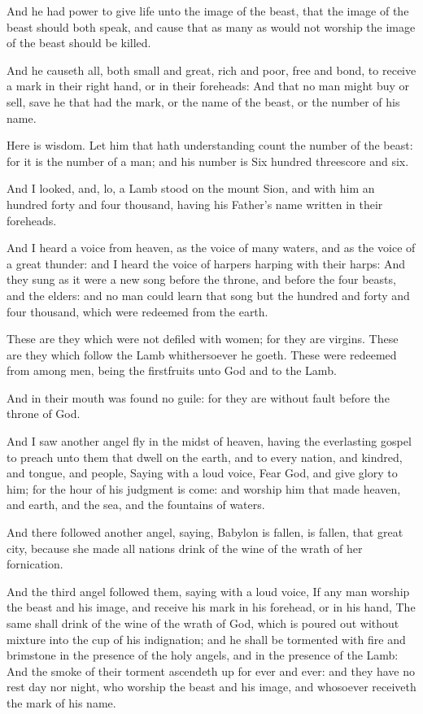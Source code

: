 \Verse And he had power to give life unto the image of the beast, that the image of the beast should both speak, and cause that as many as would not worship the image of the beast should be killed.

\Verse And he causeth all, both small and great, rich and poor, free and bond, to receive a mark in their right hand, or in their foreheads: \Verse And that no man might buy or sell, save he that had the mark, or the name of the beast, or the number of his name.

\Verse Here is wisdom. Let him that hath understanding count the number of the beast: for it is the number of a man; and his number is Six hundred threescore and six.

\Chapter
\Verse And I looked, and, lo, a Lamb stood on the mount Sion, and with him an hundred forty and four thousand, having his Father's name written in their foreheads.

\Verse And I heard a voice from heaven, as the voice of many waters, and as the voice of a great thunder: and I heard the voice of harpers harping with their harps: \Verse And they sung as it were a new song before the throne, and before the four beasts, and the elders: and no man could learn that song but the hundred and forty and four thousand, which were redeemed from the earth.

\Verse These are they which were not defiled with women; for they are virgins. These are they which follow the Lamb whithersoever he goeth.  These were redeemed from among men, being the firstfruits unto God and to the Lamb.

\Verse And in their mouth was found no guile: for they are without fault before the throne of God.

\Verse And I saw another angel fly in the midst of heaven, having the everlasting gospel to preach unto them that dwell on the earth, and to every nation, and kindred, and tongue, and people, \Verse Saying with a loud voice, Fear God, and give glory to him; for the hour of his judgment is come: and worship him that made heaven, and earth, and the sea, and the fountains of waters.

\Verse And there followed another angel, saying, Babylon is fallen, is fallen, that great city, because she made all nations drink of the wine of the wrath of her fornication.

\Verse And the third angel followed them, saying with a loud voice, If any man worship the beast and his image, and receive his mark in his forehead, or in his hand, \Verse The same shall drink of the wine of the wrath of God, which is poured out without mixture into the cup of his indignation; and he shall be tormented with fire and brimstone in the presence of the holy angels, and in the presence of the Lamb: \Verse And the smoke of their torment ascendeth up for ever and ever: and they have no rest day nor night, who worship the beast and his image, and whosoever receiveth the mark of his name.

